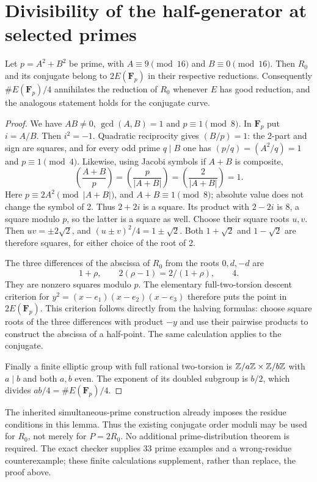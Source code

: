 \documentclass[11pt,a4paper]{article}
\begin{document}
\section{Divisibility of the half-generator at selected primes}
\begin{lemma}\label{lem:gaussian}
Let $p=A^2+B^2$ be prime, with $A\equiv9\pmod {16}$ and
$B\equiv0\pmod {16}$. Then $R_0$ and its conjugate belong to
$2E(\mathbf F_p)$ in their respective reductions. Consequently
$\#E(\mathbf F_p)/4$ annihilates the reduction of $R_0$ whenever
$E$ has good reduction, and the analogous statement holds for the
conjugate curve.
\end{lemma}
\begin{proof}
We have $AB\ne0$, $\gcd(A,B)=1$ and $p\equiv1\pmod8$. In
$\mathbf F_p$ put $i=A/B$. Then $i^2=-1$. Quadratic reciprocity
gives $(B/p)=1$: the 2-part and sign are squares, and for every odd
prime $q\mid B$ one has $(p/q)=(A^2/q)=1$ and $p\equiv1\pmod4$.
Likewise, using Jacobi symbols if $A+B$ is composite,
\[
 \left(\frac{A+B}{p}\right)
 =\left(\frac{p}{|A+B|}\right)
 =\left(\frac{2}{|A+B|}\right)=1.
\]
Here $p\equiv2A^2\pmod {|A+B|}$, and $A+B\equiv1\pmod8$;
absolute value does not change the symbol of 2. Thus $2+2i$ is a
square. Its product with $2-2i$ is 8, a square modulo $p$, so the
latter is a square as well. Choose their square roots $u,v$.
Then $uv=\pm2\sqrt2$, and
$(u\pm v)^2/4=1\pm\sqrt2$. Both $1+\sqrt2$ and $1-\sqrt2$
are therefore squares, for either choice of the root of 2.

The three differences of the abscissa of $R_0$ from the roots
$0,d,-d$ are
\[
 1+\rho,\qquad 2(\rho-1)=2/(1+\rho),\qquad4.
\]
They are nonzero squares modulo $p$. The elementary full-two-torsion
descent criterion for $y^2=(x-e_1)(x-e_2)(x-e_3)$ therefore puts the
point in $2E(\mathbf F_p)$. This criterion follows directly from the
halving formulas: choose square roots of the three differences with
product $-y$ and use their pairwise products to construct the abscissa
of a half-point. The same calculation applies to the conjugate.

Finally a finite elliptic group with full rational two-torsion is
$\mathbb Z/a\mathbb Z\times\mathbb Z/b\mathbb Z$ with $a\mid b$ and both $a,b$ even.
The exponent of its doubled subgroup is $b/2$, which divides
$ab/4=\#E(\mathbf F_p)/4$.
\end{proof}

The inherited simultaneous-prime construction already imposes the
residue conditions in this lemma. Thus the existing conjugate order
moduli may be used for $R_0$, not merely for $P=2R_0$. No additional
prime-distribution theorem is required. The exact checker supplies
33 prime examples and a wrong-residue counterexample; these finite
calculations supplement, rather than replace, the proof above.
\end{document}
